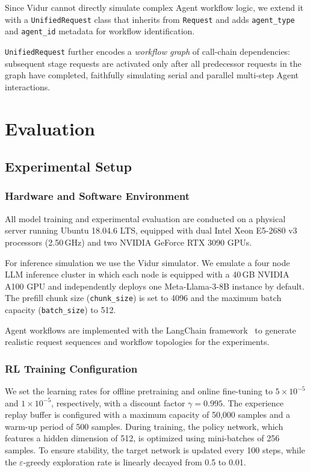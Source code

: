 \documentclass[sigconf,review,anonymous]{acmart}
\begin{document}
Since Vidur cannot directly simulate complex Agent workflow logic, we
extend it with a \texttt{UnifiedRequest} class that inherits from
\texttt{Request} and adds \texttt{agent\_type} and \texttt{agent\_id}
metadata for workflow identification.

\texttt{UnifiedRequest} further encodes a \emph{workflow graph} of
call-chain dependencies: subsequent stage requests are activated only
after all predecessor requests in the graph have completed, faithfully
simulating serial and parallel multi-step Agent interactions.


\section{Evaluation}\label{sec:evaluation}

\subsection{Experimental Setup}

\subsubsection{Hardware and Software Environment}
All model training and experimental evaluation are conducted on a
physical server running Ubuntu 18.04.6 LTS, equipped with dual Intel
Xeon E5-2680 v3 processors (2.50\,GHz) and two NVIDIA GeForce RTX
3090 GPUs.

For inference simulation we use the Vidur simulator. We emulate a
four node LLM inference cluster in which each node is equipped with a
40\,GB NVIDIA A100 GPU and independently deploys one
Meta-Llama-3-8B instance by default. The prefill chunk size (\texttt{chunk\_size})
is set to 4096 and the maximum batch capacity (\texttt{batch\_size})
to 512.

Agent workflows are implemented with the LangChain
framework~\cite{langchain} to generate realistic request sequences and
workflow topologies for the experiments.

\subsubsection{RL Training Configuration}
We set the learning rates for offline pretraining and online fine-tuning to $5\times10^{-5}$ 
and $1\times10^{-5}$, respectively, with a discount factor $\gamma = 0.995$. 
The experience replay buffer is configured with a maximum capacity of 50,000 samples 
and a warm-up period of 500 samples. During training, the policy network, 
which features a hidden dimension of 512, is optimized using mini-batches of 256 samples. 
To ensure stability, the target network is updated every 100 steps, while the 
$\varepsilon$-greedy exploration rate is linearly decayed from 0.5 to 0.01.
\end{document}
